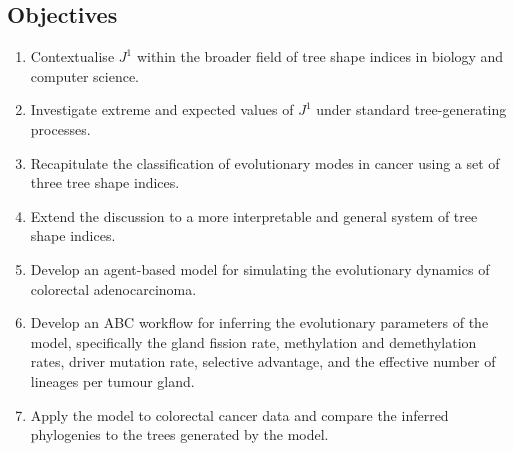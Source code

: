 \subsection{Objectives}
\begin{enumerate}
    \item Contextualise $J^1$ within the broader field of tree shape indices in biology and computer science.
    \item Investigate extreme and expected values of $J^1$ under standard tree-generating processes.
    \item Recapitulate the classification of evolutionary modes in cancer using a set of three tree shape indices.
    \item Extend the discussion to a more interpretable and general system of tree shape indices.
    \item Develop an agent-based model for simulating the evolutionary dynamics of colorectal adenocarcinoma.
    \item Develop an ABC workflow for inferring the evolutionary parameters of the model, specifically the
        gland fission rate, methylation and demethylation rates, driver mutation rate, selective advantage,
        and the effective number of lineages per tumour gland.
    \item Apply the model to colorectal cancer data and compare the inferred phylogenies to the trees generated
        by the model.
\end{enumerate}
